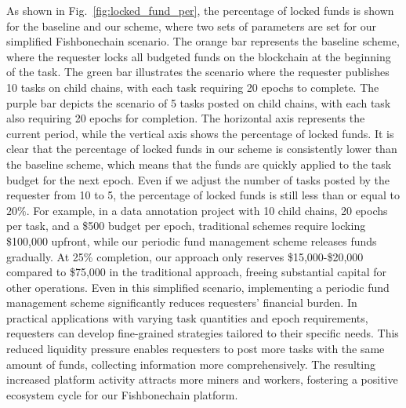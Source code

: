 \documentclass[10pt,journal]{IEEEtran}
\begin{document}
{As shown in Fig.~\ref{fig:locked_fund_per}, the percentage of locked funds is shown for the baseline and our scheme, where two sets of parameters are set for our simplified Fishbonechain scenario. The orange bar represents the baseline scheme, where the requester locks all budgeted funds on the blockchain at the beginning of the task. The green bar illustrates the scenario where the requester publishes 10 tasks on child chains, with each task requiring 20 epochs to complete. The purple bar depicts the scenario of 5 tasks posted on child chains, with each task also requiring 20 epochs for completion. The horizontal axis represents the current period, while the vertical axis shows the percentage of locked funds. It is clear that the percentage of locked funds in our scheme is consistently lower than the baseline scheme, which means that the funds are quickly applied to the task budget for the next epoch. Even if we adjust the number of tasks posted by the requester from 10 to 5, the percentage of locked funds is still less than or equal to $20 \%$. For example, in a data annotation project with 10 child chains, 20 epochs per task, and a \$500 budget per epoch, traditional schemes require locking \$100,000 upfront, while our periodic fund management scheme releases funds gradually. At 25\% completion, our approach only reserves \$15,000-\$20,000 compared to \$75,000 in the traditional approach, freeing substantial capital for other operations. Even in this simplified scenario, implementing a periodic fund management scheme significantly reduces requesters' financial burden. In practical applications with varying task quantities and epoch requirements, requesters can develop fine-grained strategies tailored to their specific needs. This reduced liquidity pressure enables requesters to post more tasks with the same amount of funds, collecting information more comprehensively. The resulting increased platform activity attracts more miners and workers, fostering a positive ecosystem cycle for our Fishbonechain platform.
}%
\end{document}
